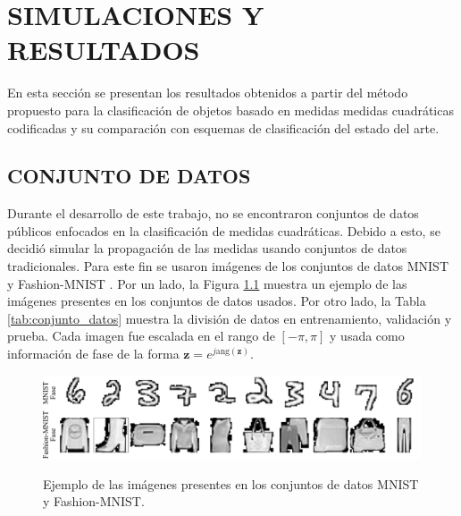 
\chapter{SIMULACIONES Y RESULTADOS}

En esta sección se presentan los resultados obtenidos a partir del método propuesto para la clasificación de objetos basado en medidas medidas cuadráticas codificadas y su comparación con esquemas de clasificación del estado del arte.

\section{CONJUNTO DE DATOS}

Durante el desarrollo de este trabajo, no se encontraron conjuntos de datos públicos enfocados en la clasificación de medidas cuadráticas. Debido a esto, se decidió simular la propagación de las medidas usando conjuntos de datos tradicionales. Para este fin se usaron imágenes de los conjuntos de datos MNIST  y Fashion-MNIST . Por un lado, la Figura \ref{fig:conjunto_datos} muestra un ejemplo de las imágenes presentes en los conjuntos de datos usados. Por otro lado, la Tabla \ref{tab:conjunto_datos} muestra la división de datos en entrenamiento, validación y prueba. Cada imagen fue escalada en el rango de $[-\pi, \pi]$ y usada como información de fase de la forma $\mathbf{z}=e^{j\mathrm{ang}(\mathbf{z})}$.

\begin{figure}[!h]
    \centering
    \caption{Ejemplo de las imágenes presentes en los conjuntos de datos MNIST y Fashion-MNIST.}
    \includegraphics[width=\linewidth]{images/resultados/datasets.pdf}
    \label{fig:conjunto_datos}
\end{figure}


